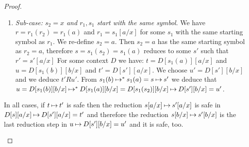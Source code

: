 \begin{proof}
\begin{enumerate}
\begin{enumerate}
\item
\emph{Sub-case: $s_2=x$ and $r_1,s_1$ start with the same symbol}. 
We have $r = r_1(r_2) = r_1(a)$ and
$r_1 = s_1[a/x]$ for some $s_1$ with the same starting symbol as $r_1$.
We re-define $s_2=a$. Then $s_2=a$ has the same starting symbol as $r_2=a$,
therefore $ s = s_1(s_2) = s_1(a)$ reduces to some $s'$ such that $r' = s'[a/x]$
For some context $D$ we have: 
$ t  = D[s_1(a)][a/x]$ and 
$ u = D[s_1(b)][b/x]$ and
$ t' = D[s'][a/x]$. 
We choose $u' = D[s'][b/x]$ 
and we deduce $t' R u'$. 
From $s_1(b) \mathbin{\mapsto}^{*} s_1(a) = s \mathbin{\mapsto}   s'$
we deduce that $u = D[s_1(b)][b/x] \mathbin{\mapsto}^{*} D[s_1(a)][b/x] 
= D[s_1(s_2)][b/x] 
\mathbin{\mapsto} D[s'][b/x] = u'$.
\end{enumerate}

In all cases, if $t \mathbin{\mapsto}   t'$ is safe then the reduction $s[a/x] \mathbin{\mapsto}   s'[a/x]$ 
is safe in $D[s][a/x] \mathbin{\mapsto}  D[s'][a/x] = t'$
and therefore the reduction $s[b/x] \mathbin{\mapsto}   s'[b/x]$
is the last reduction step in  $u \mathbin{\mapsto}   D[s'][b/x] = u'$ and it is
safe, too.
\end{enumerate}
\end{proof}






